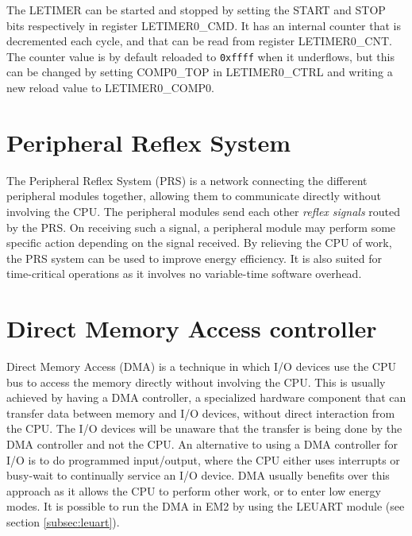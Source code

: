 The LETIMER can be started and stopped by setting the START and STOP bits respectively in register LETIMER0\_CMD. It has an internal counter that is decremented each cycle, and that can be read from register LETIMER0\_CNT. The counter value is by default reloaded to \texttt{0xffff} when it underflows, but this can be changed by setting COMP0\_TOP in LETIMER0\_CTRL and writing a new reload value to LETIMER0\_COMP0. 


\section{Peripheral Reflex System}\label{sec:prs}
The Peripheral Reflex System (PRS) is a network connecting the different peripheral modules together, allowing them to communicate directly without involving the CPU. The peripheral modules send each other \emph{reflex signals} routed by the PRS. On receiving such a signal, a peripheral module may perform some specific action depending on the signal received. By relieving the CPU of work, the PRS system can be used to improve energy efficiency. It is also suited for time-critical operations as it involves no variable-time software overhead.




\section{Direct Memory Access controller}
Direct Memory Access (DMA) is a technique in which I/O devices use the CPU bus to access the memory directly without involving the CPU. 
This is usually achieved by having a DMA controller, a specialized hardware component that can transfer data between memory and I/O devices, without direct interaction from the CPU. The I/O devices will be unaware that the transfer is being done by the DMA controller and not the CPU. An alternative to using a DMA controller for I/O is to do programmed input/output, where the CPU either uses interrupts or busy-wait to continually service an I/O device. DMA usually benefits over this approach as it allows the CPU to perform other work, or to enter low energy modes.
It is possible to run the DMA in EM2 by using the LEUART module (see section \ref{subsec:leuart}).

